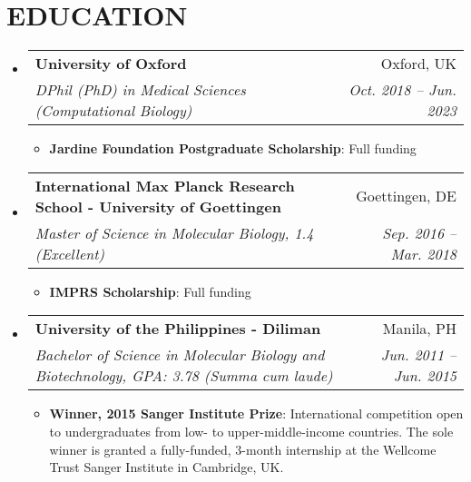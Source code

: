 \documentclass[legalpaper,11pt]{article}
\makeatletter
\newcommand{\resumeItem}[2]{
  \item\small{
    \textbf{#1}{: #2 \vspace{-2pt}}
  }
}
\newcommand{\resumeSubheading}[4]{
  \vspace{-1pt}\item
    \begin{tabular*}{0.97\textwidth}[t]{l@{\extracolsep{\fill}}r}
      \textbf{#1} & #2 \\
      \textit{\small#3} & \textit{\small #4} \\
    \end{tabular*}\vspace{-5pt}
}
\newcommand{\resumeSubHeadingListStart}{\begin{itemize}[leftmargin=*]}
\newcommand{\resumeSubHeadingListEnd}{\end{itemize}}
\newcommand{\resumeItemListStart}{\begin{itemize}}
\newcommand{\resumeItemListEnd}{\end{itemize}\vspace{-5pt}}
\makeatother
\begin{document}

\section{EDUCATION}
  \resumeSubHeadingListStart
    \resumeSubheading
      {University of Oxford}{Oxford, UK}
      {DPhil (PhD) in Medical Sciences (Computational Biology)}{Oct. 2018 -- Jun. 2023}
      \resumeItemListStart
        \resumeItem{Jardine Foundation Postgraduate Scholarship}
        {Full funding}
      \resumeItemListEnd
    \resumeSubheading
      {International Max Planck Research School - University of Goettingen}{Goettingen, DE}
      {Master of Science in Molecular Biology,  1.4 (Excellent)}{Sep. 2016 -- Mar. 2018}
      \resumeItemListStart
        \resumeItem{IMPRS Scholarship}
          {Full funding}
      \resumeItemListEnd
      \resumeSubheading
      {University of the Philippines - Diliman}{Manila, PH}
      {Bachelor of Science in Molecular Biology and Biotechnology, GPA: 3.78 (\textit{Summa cum laude})}{Jun. 2011 -- Jun. 2015}
       \resumeItemListStart
          \resumeItem{Winner, 2015 Sanger Institute Prize}
          
          {International competition open to undergraduates from low- to upper-middle-income countries. The sole winner is granted a fully-funded, 3-month internship at the Wellcome Trust Sanger Institute in Cambridge, UK.}
      \resumeItemListEnd
  \resumeSubHeadingListEnd
  
  
\end{document}
